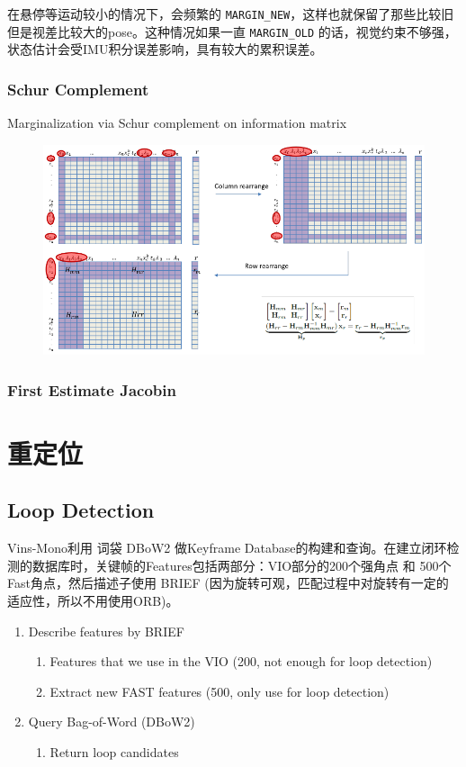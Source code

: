 \documentclass[12pt,a4paper]{article}
\begin{document}
在悬停等运动较小的情况下，会频繁的 \verb|MARGIN_NEW|，这样也就保留了那些比较旧但是视差比较大的pose。这种情况如果一直 \verb|MARGIN_OLD| 的话，视觉约束不够强，状态估计会受IMU积分误差影响，具有较大的累积误差。

\subsubsection{Schur Complement}

Marginalization via Schur complement on information matrix

\begin{figure}[htbp]
\centering
\includegraphics[scale=0.5]{images/schur_complement.png}
\end{figure}

\subsubsection{First Estimate Jacobin}

\section{重定位}

\subsection{Loop Detection}

Vins-Mono利用 词袋 DBoW2 做Keyframe Database的构建和查询。在建立闭环检测的数据库时，关键帧的Features包括两部分：VIO部分的200个强角点 和 500个Fast角点，然后描述子使用 BRIEF (因为旋转可观，匹配过程中对旋转有一定的适应性，所以不用使用ORB)。

\begin{enumerate}
\item Describe features by BRIEF
  \begin{enumerate}
  \item Features that we use in the VIO (200, not enough for loop detection)
  \item Extract new FAST features (500, only use for loop detection)
  \end{enumerate}
\item Query Bag-of-Word (DBoW2)
  \begin{enumerate}
  \item Return loop candidates
  \end{enumerate}
\end{enumerate}
\end{document}
